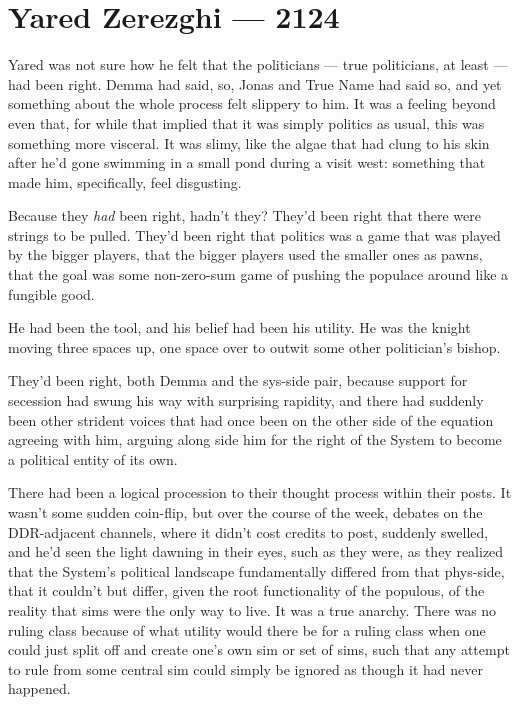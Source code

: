 \hypertarget{yared-zerezghi-2124}{%
\chapter{Yared Zerezghi — 2124}\label{yared-zerezghi-2124}}

Yared was not sure how he felt that the politicians — true politicians, at least — had been right. Demma had said, so, Jonas and True Name had said so, and yet something about the whole process felt slippery to him. It was a feeling beyond even that, for while that implied that it was simply politics as usual, this was something more visceral. It was slimy, like the algae that had clung to his skin after he'd gone swimming in a small pond during a visit west: something that made him, specifically, feel disgusting.

Because they \emph{had} been right, hadn't they? They'd been right that there were strings to be pulled. They'd been right that politics was a game that was played by the bigger players, that the bigger players used the smaller ones as pawns, that the goal was some non-zero-sum game of pushing the populace around like a fungible good.

He had been the tool, and his belief had been his utility. He was the knight moving three spaces up, one space over to outwit some other politician's bishop.

They'd been right, both Demma and the sys-side pair, because support for secession had swung his way with surprising rapidity, and there had suddenly been other strident voices that had once been on the other side of the equation agreeing with him, arguing along side him for the right of the System to become a political entity of its own.

There had been a logical procession to their thought process within their posts. It wasn't some sudden coin-flip, but over the course of the week, debates on the DDR-adjacent channels, where it didn't cost credits to post, suddenly swelled, and he'd seen the light dawning in their eyes, such as they were, as they realized that the System's political landscape fundamentally differed from that phys-side, that it couldn't but differ, given the root functionality of the populous, of the reality that sims were the only way to live. It was a true anarchy. There was no ruling class because of what utility would there be for a ruling class when one could just split off and create one's own sim or set of sims, such that any attempt to rule from some central sim could simply be ignored as though it had never happened.

